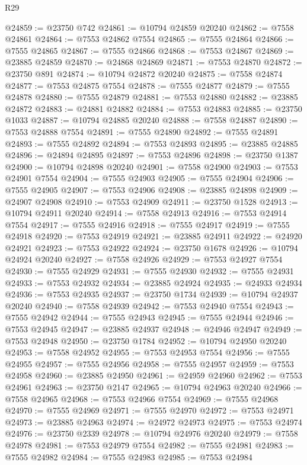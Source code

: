 \begin{lexlean}{R29}
\begin{coremodule}
@24859 := @23750 @742
@24861 := @10794 @24859 @20240
@24862 := @7558 @24861
@24864 := @7553 @24862 @7554
@24865 := @7555 @24864
@24866 := @7555 @24865
@24867 := @7555 @24866
@24868 := @7553 @24867
@24869 := @23885 @24859
@24870 := @24868 @24869
@24871 := @7553 @24870
@24872 := @23750 @891
@24874 := @10794 @24872 @20240
@24875 := @7558 @24874
@24877 := @7553 @24875 @7554
@24878 := @7555 @24877
@24879 := @7555 @24878
@24880 := @7555 @24879
@24881 := @7553 @24880
@24882 := @23885 @24872
@24883 := @24881 @24882
@24884 := @7553 @24883
@24885 := @23750 @1033
@24887 := @10794 @24885 @20240
@24888 := @7558 @24887
@24890 := @7553 @24888 @7554
@24891 := @7555 @24890
@24892 := @7555 @24891
@24893 := @7555 @24892
@24894 := @7553 @24893
@24895 := @23885 @24885
@24896 := @24894 @24895
@24897 := @7553 @24896
@24898 := @23750 @1387
@24900 := @10794 @24898 @20240
@24901 := @7558 @24900
@24903 := @7553 @24901 @7554
@24904 := @7555 @24903
@24905 := @7555 @24904
@24906 := @7555 @24905
@24907 := @7553 @24906
@24908 := @23885 @24898
@24909 := @24907 @24908
@24910 := @7553 @24909
@24911 := @23750 @1528
@24913 := @10794 @24911 @20240
@24914 := @7558 @24913
@24916 := @7553 @24914 @7554
@24917 := @7555 @24916
@24918 := @7555 @24917
@24919 := @7555 @24918
@24920 := @7553 @24919
@24921 := @23885 @24911
@24922 := @24920 @24921
@24923 := @7553 @24922
@24924 := @23750 @1678
@24926 := @10794 @24924 @20240
@24927 := @7558 @24926
@24929 := @7553 @24927 @7554
@24930 := @7555 @24929
@24931 := @7555 @24930
@24932 := @7555 @24931
@24933 := @7553 @24932
@24934 := @23885 @24924
@24935 := @24933 @24934
@24936 := @7553 @24935
@24937 := @23750 @1734
@24939 := @10794 @24937 @20240
@24940 := @7558 @24939
@24942 := @7553 @24940 @7554
@24943 := @7555 @24942
@24944 := @7555 @24943
@24945 := @7555 @24944
@24946 := @7553 @24945
@24947 := @23885 @24937
@24948 := @24946 @24947
@24949 := @7553 @24948
@24950 := @23750 @1784
@24952 := @10794 @24950 @20240
@24953 := @7558 @24952
@24955 := @7553 @24953 @7554
@24956 := @7555 @24955
@24957 := @7555 @24956
@24958 := @7555 @24957
@24959 := @7553 @24958
@24960 := @23885 @24950
@24961 := @24959 @24960
@24962 := @7553 @24961
@24963 := @23750 @2147
@24965 := @10794 @24963 @20240
@24966 := @7558 @24965
@24968 := @7553 @24966 @7554
@24969 := @7555 @24968
@24970 := @7555 @24969
@24971 := @7555 @24970
@24972 := @7553 @24971
@24973 := @23885 @24963
@24974 := @24972 @24973
@24975 := @7553 @24974
@24976 := @23750 @2339
@24978 := @10794 @24976 @20240
@24979 := @7558 @24978
@24981 := @7553 @24979 @7554
@24982 := @7555 @24981
@24983 := @7555 @24982
@24984 := @7555 @24983
@24985 := @7553 @24984

\end{coremodule}
\end{lexlean}

